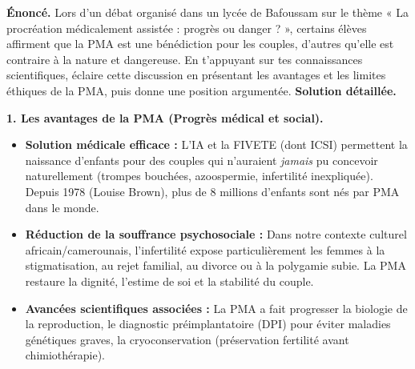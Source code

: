 \documentclass[11pt]{article}
\begin{document}
\begin{exoresolu}
\textbf{Énoncé.} Lors d'un débat organisé dans un lycée de Bafoussam sur le thème « La procréation médicalement assistée : progrès ou danger ? », certains élèves affirment que la PMA est une bénédiction pour les couples, d'autres qu'elle est contraire à la nature et dangereuse. En t'appuyant sur tes connaissances scientifiques, éclaire cette discussion en présentant les avantages et les limites éthiques de la PMA, puis donne une position argumentée.
\tcblower
\textbf{Solution détaillée.}

\textbf{1. Les avantages de la PMA (Progrès médical et social).}
\begin{itemize}
\item \textbf{Solution médicale efficace :} L'IA et la FIVETE (dont ICSI) permettent la naissance d'enfants pour des couples qui n'auraient \emph{jamais} pu concevoir naturellement (trompes bouchées, azoospermie, infertilité inexpliquée). Depuis 1978 (Louise Brown), plus de 8 millions d'enfants sont nés par PMA dans le monde.
\item \textbf{Réduction de la souffrance psychosociale :} Dans notre contexte culturel africain/camerounais, l'infertilité expose particulièrement les femmes à la stigmatisation, au rejet familial, au divorce ou à la polygamie subie. La PMA restaure la dignité, l'estime de soi et la stabilité du couple.
\item \textbf{Avancées scientifiques associées :} La PMA a fait progresser la biologie de la reproduction, le diagnostic préimplantatoire (DPI) pour éviter maladies génétiques graves, la cryoconservation (préservation fertilité avant chimiothérapie).
\end{itemize}


\end{exoresolu}
\end{document}
